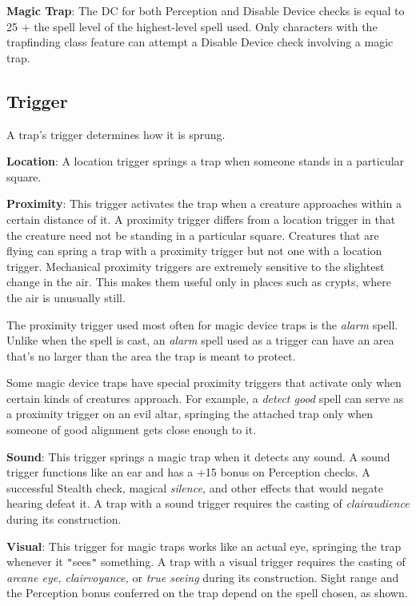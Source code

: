 \textbf{Magic Trap}: The DC for both Perception and Disable Device checks is equal to 25 + the spell level of the highest-level spell used. Only characters with the trapfinding class feature can attempt a Disable Device check involving a magic trap. 
				
\subsection{Trigger}

				
A trap's trigger determines how it is sprung.
				
\textbf{Location}: A location trigger springs a trap when someone stands in a particular square.
				
\textbf{Proximity}: This trigger activates the trap when a creature approaches within a certain distance of it. A proximity trigger differs from a location trigger in that the creature need not be standing in a particular square. Creatures that are flying can spring a trap with a proximity trigger but not one with a location trigger. Mechanical proximity triggers are extremely sensitive to the slightest change in the air. This makes them useful only in places such as crypts, where the air is unusually still.
				
The proximity trigger used most often for magic device traps is the \textit{alarm }spell. Unlike when the spell is cast, an \textit{alarm }spell used as a trigger can have an area that's no larger than the area the trap is meant to protect.
				
Some magic device traps have special proximity triggers that activate only when certain kinds of creatures approach. For example, a \textit{detect good }spell can serve as a proximity trigger on an evil altar, springing the attached trap only when someone of good alignment gets close enough to it.
				
\textbf{Sound}: This trigger springs a magic trap when it detects any sound. A sound trigger functions like an ear and has a +15 bonus on Perception checks. A successful Stealth check, magical \textit{silence, }and other effects that would negate hearing defeat it. A trap with a sound trigger requires the casting of \textit{clairaudience }during its construction.
				
\textbf{Visual}: This trigger for magic traps works like an actual eye, springing the trap whenever it \texttt{{}"{}}sees\texttt{{}"{}} something. A trap with a visual trigger requires the casting of \textit{arcane eye, clairvoyance, }or \textit{true seeing }during its construction. Sight range and the Perception bonus conferred on the trap depend on the spell chosen, as shown.

